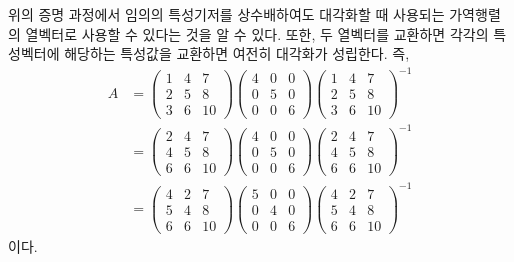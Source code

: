 \documentclass[../engineering_mathematics_lecture_note.tex]{subfiles}
\begin{document}
\begin{remark}
    위의 증명 과정에서 임의의 특성기저를 상수배하여도 대각화할 때 사용되는 가역행렬의 열벡터로 사용할 수 있다는 것을 알 수 있다.
    또한, 두 열벡터를 교환하면 각각의 특성벡터에 해당하는 특성값을 교환하면 여전히 대각화가 성립한다.
    즉,
    \begin{align*}
        A &=
        \begin{pmatrix}
            1 & 4 & 7\\
            2 & 5 & 8\\
            3 & 6 & 10
        \end{pmatrix}
        \begin{pmatrix}
            4 & 0 & 0\\
            0 & 5 & 0\\
            0 & 0 & 6
        \end{pmatrix}
        \begin{pmatrix}
            1 & 4 & 7\\
            2 & 5 & 8\\
            3 & 6 & 10
        \end{pmatrix}^{-1}\\
          &=
        \begin{pmatrix}
            2 & 4 & 7\\
            4 & 5 & 8\\
            6 & 6 & 10
        \end{pmatrix}
        \begin{pmatrix}
            4 & 0 & 0\\
            0 & 5 & 0\\
            0 & 0 & 6
        \end{pmatrix}
        \begin{pmatrix}
            2 & 4 & 7\\
            4 & 5 & 8\\
            6 & 6 & 10
        \end{pmatrix}^{-1}\\
          &=
        \begin{pmatrix}
            4 & 2 & 7\\
            5 & 4 & 8\\
            6 & 6 & 10
        \end{pmatrix}
        \begin{pmatrix}
            5 & 0 & 0\\
            0 & 4 & 0\\
            0 & 0 & 6
        \end{pmatrix}
        \begin{pmatrix}
            4 & 2 & 7\\
            5 & 4 & 8\\
            6 & 6 & 10
        \end{pmatrix}^{-1}
    \end{align*}
    이다.
\end{remark}
\end{document}
